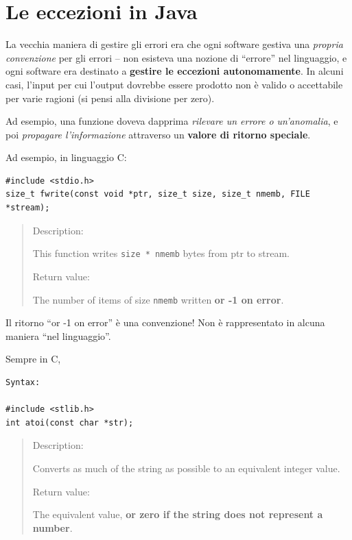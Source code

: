 \documentclass[\fontsizeclass,twocolumn]{\classname}
\theoremstyle{definition}
\theoremstyle{definition}
\begin{document}
\chapter{Le eccezioni in Java}

La vecchia maniera di gestire gli errori era che ogni software gestiva una
\emph{propria convenzione} per gli errori -- non esisteva una nozione di
``errore'' nel linguaggio, e ogni software era destinato a \textbf{gestire le
eccezioni autonomamente}. In alcuni casi, l'input per cui l'output dovrebbe
essere prodotto non è valido o accettabile per varie ragioni (si pensi alla
divisione per zero).

Ad esempio, una funzione doveva dapprima \emph{rilevare un errore o
un'anomalia}, e poi \emph{propagare l'informazione} attraverso un
\textbf{valore di ritorno speciale}.

Ad esempio, in linguaggio C:

\begin{lstlisting}
#include <stdio.h>
size_t fwrite(const void *ptr, size_t size, size_t nmemb, FILE *stream);
\end{lstlisting}

\begin{quote}
    \footnotesize{Description:

        This function writes \texttt{size * nmemb} bytes from ptr to stream.

Return value:

The number of items of size \texttt{nmemb} written \textbf{or -1 on error}.}
\end{quote}

Il ritorno ``or -1 on error'' è una convenzione! Non è rappresentato in alcuna
maniera ``nel linguaggio''.

Sempre in C,

\begin{lstlisting}
Syntax:

#include <stlib.h>
int atoi(const char *str);

\end{lstlisting}

\begin{quote}
    \footnotesize{
Description:

Converts as much of the string as possible to an equivalent integer value.

Return value:

The equivalent value, \textbf{or zero if the string does not represent a
number}.
}
\end{quote}
\end{document}
